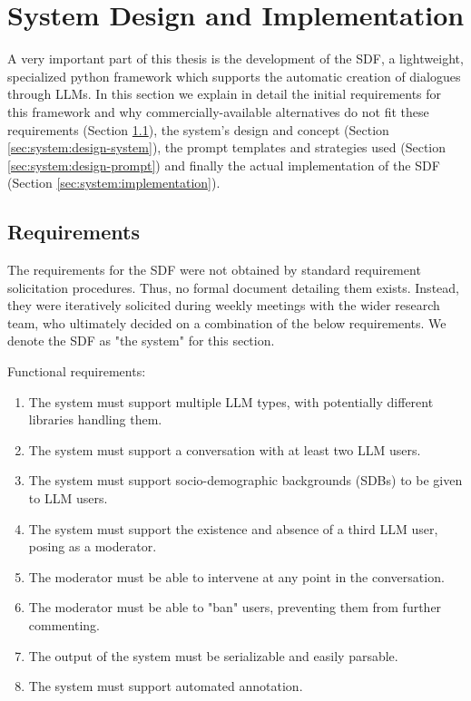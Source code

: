 %
\chapter{System Design and Implementation}
\label{sec:system}

A very important part of this thesis is the development of the \ac{SDF}, a lightweight, specialized python framework which supports the automatic creation of dialogues through LLMs. In this section we explain in detail the initial requirements for this framework and why commercially-available alternatives do not fit these requirements (Section \ref{sec:system:requirements}), the system's design and concept (Section \ref{sec:system:design-system}), the prompt templates and strategies used (Section \ref{sec:system:design-prompt}) and finally the actual implementation of the \ac{SDF} (Section \ref{sec:system:implementation}).

\section{Requirements}
\label{sec:system:requirements}

The requirements for the \ac{SDF} were not obtained by standard requirement solicitation procedures.  Thus, no formal document detailing them exists. Instead, they were iteratively solicited during weekly meetings with the wider research team, who ultimately decided on a combination of the below requirements. We denote the \ac{SDF} as "the system" for this section.

Functional requirements:
\begin{enumerate}
	\item The system must support multiple LLM types, with potentially different libraries handling them.
	\item The system must support a conversation with at least two LLM users.
	\item The system must support socio-demographic backgrounds (SDBs) to be given to LLM users.
	\item The system must support the existence and absence of a third LLM user, posing as a moderator.
	\item The moderator must be able to intervene at any point in the conversation.
	\item The moderator must be able to "ban" users, preventing them from further commenting.
	\item The output of the system must be serializable and easily parsable.
	\item The system must support automated annotation.
\end{enumerate}

